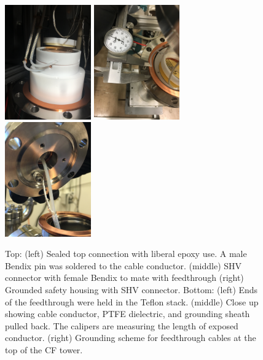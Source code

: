 \begin{figure}[htbp]
\includegraphics[width=0.33\textwidth, angle=-90]{figures/testbed/ft6_1.jpg}
\includegraphics[width=0.33\textwidth, angle=-90]{figures/testbed/ft6_2.jpg}  
\includegraphics[width=0.33\textwidth, angle=-90]{figures/testbed/ft6_3.jpg}
\caption{Top: (left) Sealed top connection with liberal epoxy use. A male Bendix pin was soldered to the cable conductor. (middle) \acs{SHV} connector with female Bendix to mate with feedthrough (right) Grounded safety housing with \acs{SHV} connector. Bottom: (left) Ends of the feedthrough were held in the Teflon stack. (middle) Close up showing cable conductor, \acs{PTFE} dielectric, and grounding sheath pulled back. The calipers are measuring the length of exposed conductor. (right) Grounding scheme for feedthrough cables at the top of the \acs{CF} tower.}
 \label{fig:cableft}
\end{figure}

